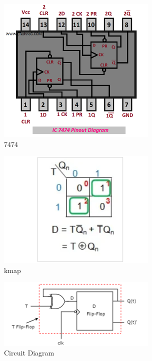 \documentclass{article}
\begin{document}
\begin{figure}
\centering
\includegraphics[width=3in]{IC 7474 Pinout Diagram.png}
\caption{7474}
\label{fig:circuit}
\end{figure}
\begin{figure}
\centering
\includegraphics[width=3in]{kmap.png}
\caption{kmap}
\label{fig:circuit}
\end{figure}
\begin{figure}
\centering
\includegraphics[width=3in]{circuit_diagram_of_t_flip_flop.png}
\caption{Circuit Diagram}

\end{figure}
\end{document}
